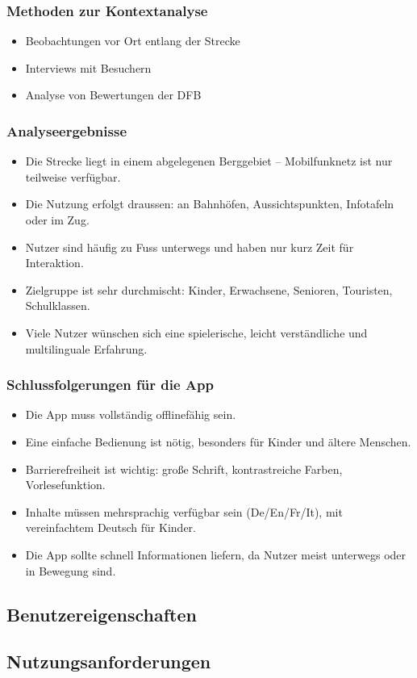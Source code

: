 \documentclass[10pt]{article}
\begin{document}
	\subsubsection{Methoden zur Kontextanalyse}
	
	\begin{itemize}
		\item Beobachtungen vor Ort entlang der Strecke
		\item Interviews mit Besuchern
		\item Analyse von Bewertungen der DFB
	\end{itemize}
	
	\subsubsection{Analyseergebnisse}
	\begin{itemize}
		\item Die Strecke liegt in einem abgelegenen Berggebiet – Mobilfunknetz ist nur teilweise verfügbar.
		\item Die Nutzung erfolgt draussen: an Bahnhöfen, Aussichtspunkten, Infotafeln oder im Zug.
		\item Nutzer sind häufig zu Fuss unterwegs und haben nur kurz Zeit für Interaktion.
		\item Zielgruppe ist sehr durchmischt: Kinder, Erwachsene, Senioren, Touristen, Schulklassen.
		\item Viele Nutzer wünschen sich eine spielerische, leicht verständliche und multilinguale Erfahrung.
	\end{itemize}
	
	\subsubsection{Schlussfolgerungen für die App}
	\begin{itemize}
		\item Die App muss vollständig offlinefähig sein.
		\item Eine einfache Bedienung ist nötig, besonders für Kinder und ältere Menschen.
		\item Barrierefreiheit ist wichtig: große Schrift, kontrastreiche Farben, Vorlesefunktion.
		\item Inhalte müssen mehrsprachig verfügbar sein (De/En/Fr/It), mit vereinfachtem Deutsch für Kinder.
		\item Die App sollte schnell Informationen liefern, da Nutzer meist unterwegs oder in Bewegung sind.
	\end{itemize}
	\pagebreak
	\subsection{Benutzereigenschaften}
	\pagebreak
	\subsection{Nutzungsanforderungen}
\end{document}
